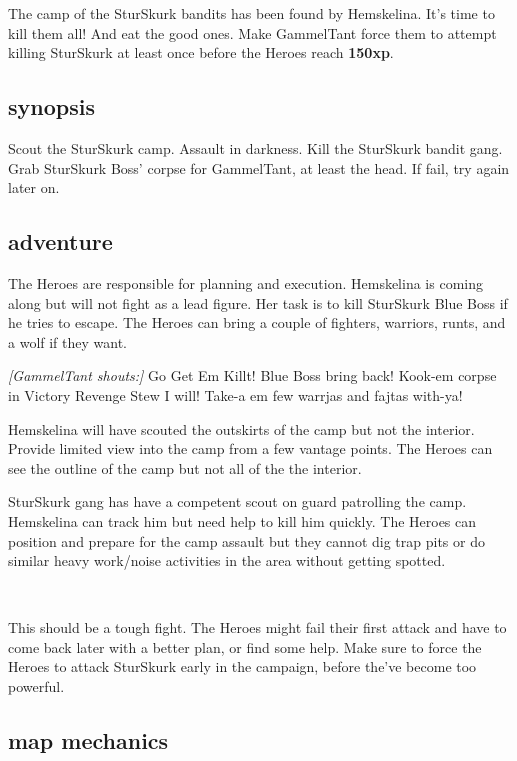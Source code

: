 The camp of the SturSkurk bandits has been found by Hemskelina. It's time to kill them all! And eat the good ones.
Make GammelTant force them to attempt killing SturSkurk at least once before the Heroes reach \textbf{150xp}.


\subsection*{synopsis}

Scout the SturSkurk camp. Assault in darkness. Kill the SturSkurk bandit gang. Grab SturSkurk Boss' corpse for GammelTant, at least the head. If fail, try again later on.


\subsection*{adventure}

The Heroes are responsible for planning and execution. Hemskelina is coming along but will not fight as a lead figure. Her task is to kill SturSkurk Blue Boss if he tries to escape.
The Heroes can bring a couple of fighters, warriors, runts, and a wolf if they want.

\begin{readoutloud}
\emph{[GammelTant shouts:]}
Go Get Em Killt! Blue Boss bring back! Kook-em corpse in Victory Revenge Stew I will! Take-a em few warrjas and fajtas with-ya!
\end{readoutloud}

Hemskelina will have scouted the outskirts of the camp but not the interior. Provide limited view into the camp from a few vantage points. The Heroes can see the outline of the camp but not all of the the interior.

SturSkurk gang has have a competent scout on guard patrolling the camp. Hemskelina can track him but need help to kill him quickly.
The Heroes can position and prepare for the camp assault but they cannot dig trap pits or do similar heavy work/noise activities in the area without getting spotted. 

\

This should be a tough fight. The Heroes might fail their first attack and have to come back later with a better plan, or find some help. Make sure to force the Heroes to attack SturSkurk early in the campaign, before the've become too powerful.


\subsection*{map mechanics}

